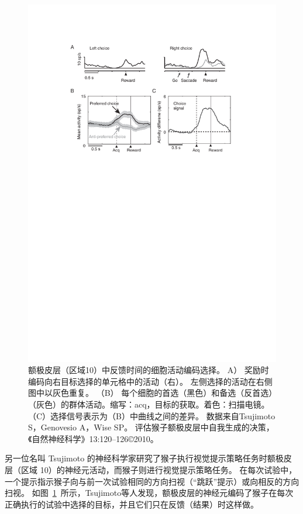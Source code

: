 \begin{figure}[!htb]
	\centering
	\includegraphics{chap3/3_9}
	\caption{额极皮层（区域10）中反馈时间的细胞活动编码选择。
		A） 奖励时编码向右目标选择的单元格中的活动（右）。
		左侧选择的活动在右侧图中以灰色重复。
		（B） 每个细胞的首选（黑色）和备选（反首选）（灰色）的群体活动。缩写：acq，目标的获取。着色：扫描电镜。（C）选择信号表示为（B）中曲线之间的差异。
		数据来自Tsujimoto S，Genovesio A，Wise SP。
		评估猴子额极皮层中自我生成的决策，《自然神经科学》13:120–126©2010。}
	\label{fig:3_9}
\end{figure}


另一位名叫 Tsujimoto 的神经科学家研究了猴子执行视觉提示策略任务时额极皮层（区域 10）的神经元活动，而猴子则进行视觉提示策略任务\cite{tsujimoto2010evaluating}。
在每次试验中，一个提示指示猴子向与前一次试验相同的方向扫视（“跳跃”提示）或向相反的方向扫视。
如图~\ref{fig:3_9}~所示，Tsujimoto等人发现，额极皮层的神经元编码了猴子在每次正确执行的试验中选择的目标，并且它们只在反馈（结果）时这样做。\par


